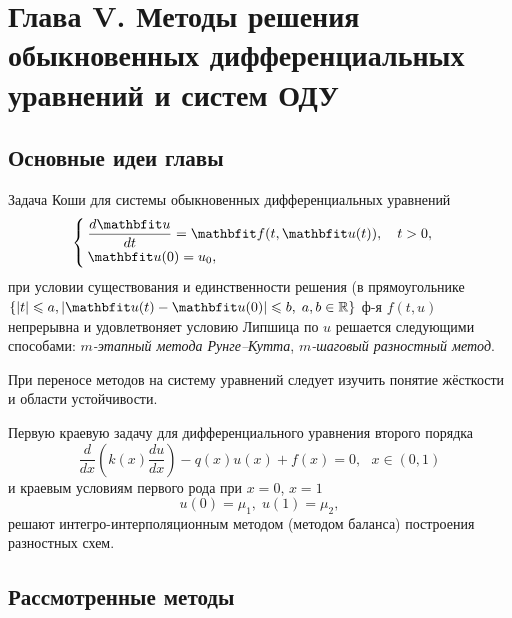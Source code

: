 \newpage
{}
\pagestyle{empty}
\vspace{0.5cm}

\section*{Глава V. Методы решения обыкновенных дифференциальных уравнений и систем ОДУ}

\subsection{Основные идеи главы} 

Задача Коши для системы обыкновенных дифференциальных уравнений
\begin{equation}
%
    \label{Koshi_sys}
    \begin{cases}
        \dfrac{d\vfunc{u}}{dt} = \vfunc{f}(t, \vfunc{u}(t)), \quad t > 0, \\
        \vfunc{u}(0) = u_0,
    \end{cases}
\end{equation}
при условии существования и единственности решения (в прямоугольнике $\{|t| \leqslant a, | \vfunc{u}(t)-\vfunc{u}(0)| \leqslant b,\; a, b\in\mathbb{R}\}$ ф-я $f(t, u)$ непрерывна и удовлетвоняет условию Липшица по $u$ решается следующими способами: \textit{$m$-этапный метода Рунге--Кутта}, \textit{ $m$-шаговый разностный метод}.

При переносе методов на систему уравнений следует изучить понятие жёсткости и области устойчивости.
 
Первую краевую задачу для дифференциального уравнения второго порядка
\begin{equation}
    \label{eq:2-ord-eq}
    \dfrac{d}{dx}\left(k(x)\dfrac{du}{dx}\right) - q(x)u(x) + f(x) = 0, ~~~x\in(0,1)
\end{equation}
%
и краевым условиям первого рода при $x=0$, $x=1$
%
\begin{equation}
    \label{eq:2-ord-eq-bounds}
    u(0) = \mu_1,\;u(1) = \mu_2,
\end{equation}
%
решают интегро-интерполяционным методом (методом баланса) построения разностных схем.

\subsection{Рассмотренные методы}